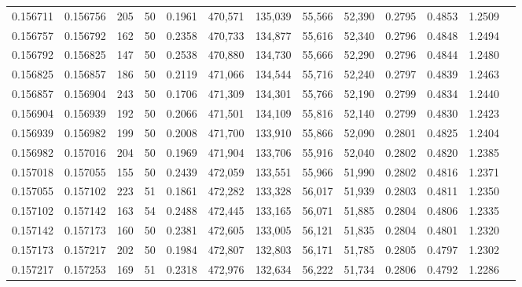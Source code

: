 \begin{tabular}{rrrrrrrrrrrrr}
0.156711 & 0.156756 &   205 &  50 &                                     0.1961 & 470,571 & 135,039 &  55,566 &  52,390 & 0.2795 & 0.4853 & 1.2509 \\
0.156757 & 0.156792 &   162 &  50 &                                     0.2358 & 470,733 & 134,877 &  55,616 &  52,340 & 0.2796 & 0.4848 & 1.2494 \\
0.156792 & 0.156825 &   147 &  50 &                                     0.2538 & 470,880 & 134,730 &  55,666 &  52,290 & 0.2796 & 0.4844 & 1.2480 \\
0.156825 & 0.156857 &   186 &  50 &                                     0.2119 & 471,066 & 134,544 &  55,716 &  52,240 & 0.2797 & 0.4839 & 1.2463 \\
0.156857 & 0.156904 &   243 &  50 &                                     0.1706 & 471,309 & 134,301 &  55,766 &  52,190 & 0.2799 & 0.4834 & 1.2440 \\
0.156904 & 0.156939 &   192 &  50 &                                     0.2066 & 471,501 & 134,109 &  55,816 &  52,140 & 0.2799 & 0.4830 & 1.2423 \\
0.156939 & 0.156982 &   199 &  50 &                                     0.2008 & 471,700 & 133,910 &  55,866 &  52,090 & 0.2801 & 0.4825 & 1.2404 \\
0.156982 & 0.157016 &   204 &  50 &                                     0.1969 & 471,904 & 133,706 &  55,916 &  52,040 & 0.2802 & 0.4820 & 1.2385 \\
0.157018 & 0.157055 &   155 &  50 &                                     0.2439 & 472,059 & 133,551 &  55,966 &  51,990 & 0.2802 & 0.4816 & 1.2371 \\
0.157055 & 0.157102 &   223 &  51 &                                     0.1861 & 472,282 & 133,328 &  56,017 &  51,939 & 0.2803 & 0.4811 & 1.2350 \\
0.157102 & 0.157142 &   163 &  54 &                                     0.2488 & 472,445 & 133,165 &  56,071 &  51,885 & 0.2804 & 0.4806 & 1.2335 \\
0.157142 & 0.157173 &   160 &  50 &                                     0.2381 & 472,605 & 133,005 &  56,121 &  51,835 & 0.2804 & 0.4801 & 1.2320 \\
0.157173 & 0.157217 &   202 &  50 &                                     0.1984 & 472,807 & 132,803 &  56,171 &  51,785 & 0.2805 & 0.4797 & 1.2302 \\
0.157217 & 0.157253 &   169 &  51 &                                     0.2318 & 472,976 & 132,634 &  56,222 &  51,734 & 0.2806 & 0.4792 & 1.2286 \\

\end{tabular}
